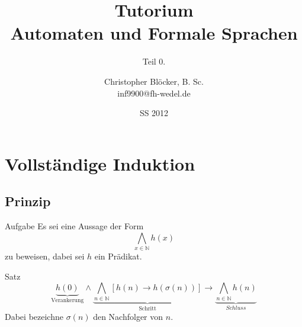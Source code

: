 \documentclass[]{beamer}
\author[Christopher Blöcker, B. Sc.]{Christopher Blöcker, B. Sc.\\ inf9900@fh-wedel.de}
\title[AFS Tutorium]{Tutorium\\Automaten und Formale Sprachen}
\date{SS 2012}
\subtitle{Teil 0.}
\begin{document}
\begin{frame}{}
  \titlepage
\end{frame}



\section{Vollständige Induktion}

\subsection{Prinzip}

\begin{frame}[<+->][squeeze]{}
  \begin{alertblock}{Aufgabe}
    Es sei eine Aussage der Form
    \[\bigwedge_{x \in \mathbb{N}} h \left( x \right)\]
    zu beweisen, dabei sei $h$ ein Prädikat.
  \end{alertblock}
  
  \begin{block}{Satz}
    \[\underbrace{h \left( 0 \right)}_{\text{Verankerung}}
      \land
      \underbrace{\bigwedge_{n \in \mathbb{N}} \left[h \left( n \right) \rightarrow h \left( \sigma \left( n \right) \right)\right]}_{\text{Schritt}} 
      \rightarrow 
      \underbrace{\bigwedge_{n \in \mathbb{N}} h \left( n \right)}_{Schluss}\] 
    Dabei bezeichne $\sigma \left( n \right)$ den Nachfolger von $n$.
  \end{block}
\end{frame}
\end{document}
